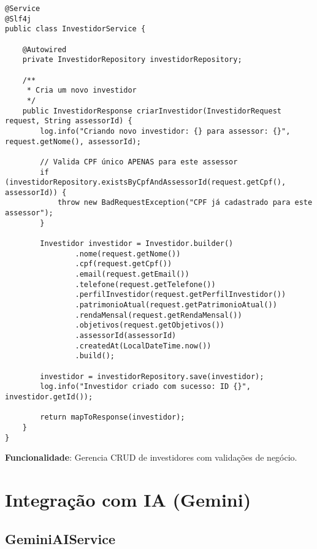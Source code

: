 \documentclass[12pt,a4paper]{article}
\begin{document}
\begin{lstlisting}[caption=InvestidorService - Criação de Investidor]
@Service
@Slf4j
public class InvestidorService {
    
    @Autowired
    private InvestidorRepository investidorRepository;
    
    /**
     * Cria um novo investidor
     */
    public InvestidorResponse criarInvestidor(InvestidorRequest request, String assessorId) {
        log.info("Criando novo investidor: {} para assessor: {}", request.getNome(), assessorId);

        // Valida CPF único APENAS para este assessor
        if (investidorRepository.existsByCpfAndAssessorId(request.getCpf(), assessorId)) {
            throw new BadRequestException("CPF já cadastrado para este assessor");
        }

        Investidor investidor = Investidor.builder()
                .nome(request.getNome())
                .cpf(request.getCpf())
                .email(request.getEmail())
                .telefone(request.getTelefone())
                .perfilInvestidor(request.getPerfilInvestidor())
                .patrimonioAtual(request.getPatrimonioAtual())
                .rendaMensal(request.getRendaMensal())
                .objetivos(request.getObjetivos())
                .assessorId(assessorId)
                .createdAt(LocalDateTime.now())
                .build();

        investidor = investidorRepository.save(investidor);
        log.info("Investidor criado com sucesso: ID {}", investidor.getId());

        return mapToResponse(investidor);
    }
}
\end{lstlisting}

\textbf{Funcionalidade}: Gerencia CRUD de investidores com validações de negócio.

\section{Integração com IA (Gemini)}

\subsection{GeminiAIService}
\end{document}
